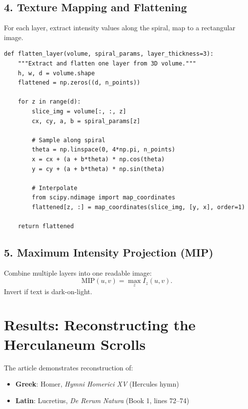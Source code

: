 \subsection{4. Texture Mapping and Flattening}
For each layer, extract intensity values along the spiral, map to a rectangular image.

\begin{lstlisting}[style=python,caption=Layer flattening]
def flatten_layer(volume, spiral_params, layer_thickness=3):
    """Extract and flatten one layer from 3D volume."""
    h, w, d = volume.shape
    flattened = np.zeros((d, n_points))
    
    for z in range(d):
        slice_img = volume[:, :, z]
        cx, cy, a, b = spiral_params[z]
        
        # Sample along spiral
        theta = np.linspace(0, 4*np.pi, n_points)
        x = cx + (a + b*theta) * np.cos(theta)
        y = cy + (a + b*theta) * np.sin(theta)
        
        # Interpolate
        from scipy.ndimage import map_coordinates
        flattened[z, :] = map_coordinates(slice_img, [y, x], order=1)
    
    return flattened
\end{lstlisting}

\subsection{5. Maximum Intensity Projection (MIP)}
Combine multiple layers into one readable image:
\[
\mathrm{MIP}(u,v) = \max_{z} I_z(u,v).
\]
Invert if text is dark-on-light.

\section{Results: Reconstructing the Herculaneum Scrolls} \cite{foschiatti2025tomography}
\label{sec:tom:results}

The article demonstrates reconstruction of:
\begin{itemize}
    \item \textbf{Greek}: Homer, \textit{Hymni Homerici XV} (Hercules hymn)
    \item \textbf{Latin}: Lucretius, \textit{De Rerum Natura} (Book 1, lines 72--74)
\end{itemize}



